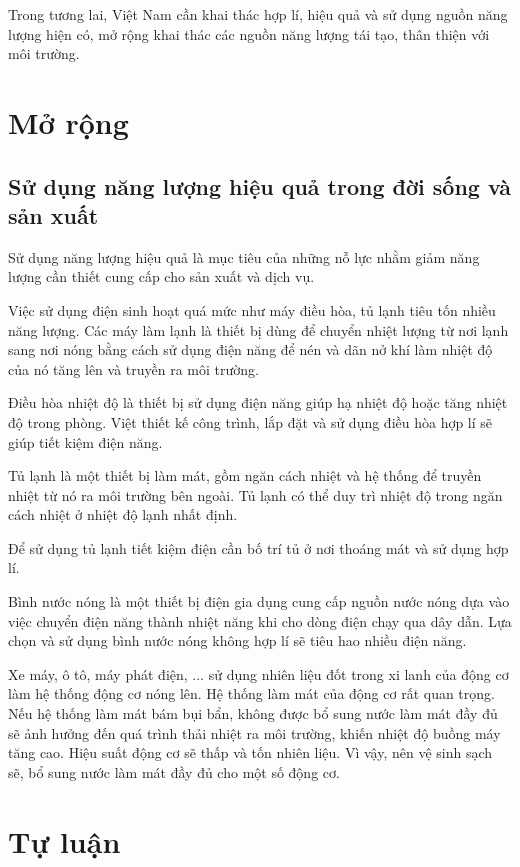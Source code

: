 Trong tương lai, Việt Nam cần khai thác hợp lí, hiệu quả và sử dụng nguồn năng lượng hiện có, mở rộng khai thác các nguồn năng lượng tái tạo, thân thiện với môi trường.
\section{Mở rộng}
\subsection{Sử dụng năng lượng hiệu quả trong đời sống và sản xuất}
Sử dụng năng lượng hiệu quả là mục tiêu của những nỗ lực nhằm giảm năng lượng cần thiết cung cấp cho sản xuất và dịch vụ.

Việc sử dụng điện sinh hoạt quá mức như máy điều hòa, tủ lạnh tiêu tốn nhiều năng lượng. Các máy làm lạnh là thiết bị dùng để chuyển nhiệt lượng từ nơi lạnh sang nơi nóng bằng cách sử dụng điện năng để nén và dãn nở khí làm nhiệt độ của nó tăng lên và truyền ra môi trường.

Điều hòa nhiệt độ là thiết bị sử dụng điện năng giúp hạ nhiệt độ hoặc tăng nhiệt độ trong phòng. Việt thiết kế công trình, lắp đặt và sử dụng điều hòa hợp lí sẽ giúp tiết kiệm điện năng.

Tủ lạnh là một thiết bị làm mát, gồm ngăn cách nhiệt và hệ thống để truyền nhiệt từ nó ra môi trường bên ngoài. Tủ lạnh có thể duy trì nhiệt độ trong ngăn cách nhiệt ở nhiệt độ lạnh nhất định.

Để sử dụng tủ lạnh tiết kiệm điện cần bố trí tủ ở nơi thoáng mát và sử dụng hợp lí.

Bình nước nóng là một thiết bị điện gia dụng cung cấp nguồn nước nóng dựa vào việc chuyển điện năng thành nhiệt năng khi cho dòng điện chạy qua dây dẫn. Lựa chọn và sử dụng bình nước nóng không hợp lí sẽ tiêu hao nhiều điện năng.

Xe máy, ô tô, máy phát điện, $\ldots$ sử dụng nhiên liệu đốt trong xi lanh của động cơ làm hệ thống động cơ nóng lên. Hệ thống làm mát của động cơ rất quan trọng. Nếu hệ thống làm mát bám bụi bẩn, không được bổ sung nước làm mát đầy đủ sẽ ảnh hưởng đến quá trình thải nhiệt ra môi trường, khiến nhiệt độ buồng máy tăng cao. Hiệu suất động cơ sẽ thấp và tốn nhiên liệu. Vì vậy, nên vệ sinh sạch sẽ, bổ sung nước làm mát đầy đủ cho một số động cơ.
\section{Tự luận}
\setcounter{section}{0}

